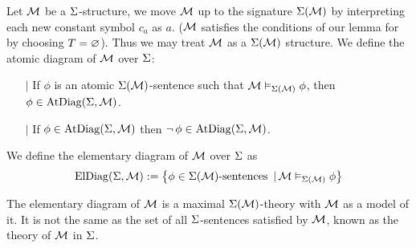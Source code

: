 \begin{dfn}
    Let $\mathcal{M}$ be a $\Sigma$-structure,
    we move $\mathcal{M}$ up to the signature $\Sigma(\mathcal{M})$
    by interpreting each new constant symbol $c_a$ as $a$.
    ($\mathcal{M}$ satisfies the conditions of our lemma for
    by choosing $T = \varnothing$).
    Thus we may treat $\mathcal{M}$ as a $\Sigma(\mathcal{M})$ structure.
    We define the atomic diagram of $\mathcal{M}$ over $\Sigma$:
    \begin{itemize}
        \item[$\vert$] If $\phi$ is an atomic
        $\Sigma(\mathcal{M})$-sentence such that $\mathcal{M} \vDash_{\Sigma(\mathcal{M})} \phi$,
        then $\phi \in \mathrm{AtDiag}(\Sigma,\mathcal{M})$.
        \item[$\vert$] If $\phi \in \mathrm{AtDiag}(\Sigma,\mathcal{M})$ then 
        $\neg\, \phi \in \mathrm{AtDiag}(\Sigma,\mathcal{M})$.
    \end{itemize}
    We define the elementary diagram of $\mathcal{M}$ over $\Sigma$ as 
    \[
        \mathrm{ElDiag}(\Sigma,\mathcal{M}) := 
        \left\{\phi \in \Sigma(\mathcal{M})\text{-sentences } \,|\, \mathcal{M} \vDash_{\Sigma(\mathcal{M})} \phi\right\}
    \]

    The elementary diagram of $\mathcal{M}$ is a maximal $\Sigma(\mathcal{M})$-theory 
    with $\mathcal{M}$ as a model of it.
    It is not the same as the set of all $\Sigma$-sentences satisfied by $\mathcal{M}$,
    known as the theory of $\mathcal{M}$ in $\Sigma$.
\end{dfn}

